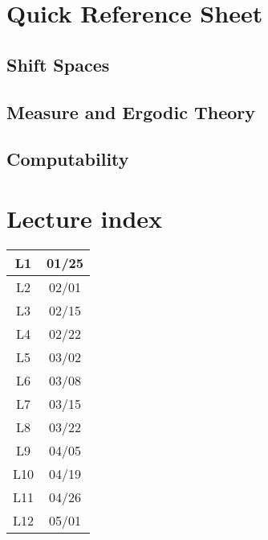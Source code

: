 \documentclass[11pt, reqno]{amsart}
\theoremstyle{plain}
\theoremstyle{definition}
\begin{document}
\appendix
\section{Quick Reference Sheet}
\subsection{Shift Spaces}
\subsection{Measure and Ergodic Theory}
\subsection{Computability}

\section{Lecture index}  

\begin{tabular}{|c|c|}\hline
  L1 & 01/25 \\ \hline
  L2 & 02/01 \\ \hline
  L3 & 02/15 \\ \hline
  L4 & 02/22 \\ \hline
  L5 & 03/02 \\ \hline
  L6 & 03/08 \\ \hline
  L7 & 03/15 \\ \hline
  L8 & 03/22 \\ \hline
  L9 & 04/05 \\ \hline
  L10 & 04/19 \\ \hline
  L11 & 04/26 \\ \hline
  L12 & 05/01 \\ \hline
\end{tabular}

\printbibliography
\end{document}
